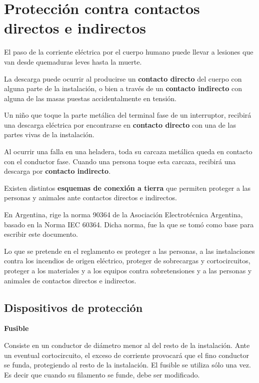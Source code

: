 
\chapter{Protección contra contactos directos e indirectos}

El paso de la corriente eléctrica por el cuerpo humano puede llevar a lesiones que van desde quemaduras leves hasta la muerte.

La descarga puede ocurrir al producirse un \textbf{contacto directo} del cuerpo con alguna parte de la instalación, o bien a través de un \textbf{contacto indirecto} con alguna de las masas puestas accidentalmente en tensión.

\begin{ejemplo}
	Un niño que toque la parte metálica del terminal fase de un interruptor, recibirá una descarga eléctrica por encontrarse en \textbf{contacto directo} con una de las partes vivas de la instalación.
	
	Al ocurrir una falla en una heladera, toda su carcaza metálica queda en contacto con el conductor fase. Cuando una persona toque esta carcaza, recibirá una descarga por \textbf{contacto indirecto}.
\end{ejemplo}

Existen distintos \textbf{esquemas de conexión a tierra} que permiten proteger a las personas y animales ante contactos directos e indirectos.

En Argentina, rige la norma 90364 de la Asociación Electrotécnica Argentina, basado en la Norma IEC 60364. Dicha norma, fue la que se tomó como base para escribir este documento.

Lo que se pretende en el reglamento es proteger a las personas, a las instalaciones contra los incendios de origen eléctrico, proteger de sobrecargas y cortocircuitos, proteger a los materiales y a los equipos contra sobretensiones y a las personas y animales de contactos directos e indirectos.

\section{Dispositivos de protección}
\textbf{Fusible}

Consiste en un conductor de diámetro menor al del resto de la instalación. Ante un eventual cortocircuito, el exceso de corriente provocará que el fino conductor se funda, protegiendo al resto de la instalación. El fusible se utiliza sólo una vez. Es decir que cuando su filamento se funde, debe ser modificado.

